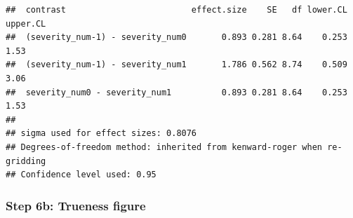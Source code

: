 \documentclass[
]{article}
\begin{document}
\begin{verbatim}
##  contrast                         effect.size    SE   df lower.CL upper.CL
##  (severity_num-1) - severity_num0       0.893 0.281 8.64    0.253     1.53
##  (severity_num-1) - severity_num1       1.786 0.562 8.74    0.509     3.06
##  severity_num0 - severity_num1          0.893 0.281 8.64    0.253     1.53
## 
## sigma used for effect sizes: 0.8076 
## Degrees-of-freedom method: inherited from kenward-roger when re-gridding 
## Confidence level used: 0.95
\end{verbatim}

\subsubsection{Step 6b: Trueness figure}\label{step-6b-trueness-figure}
\end{document}
